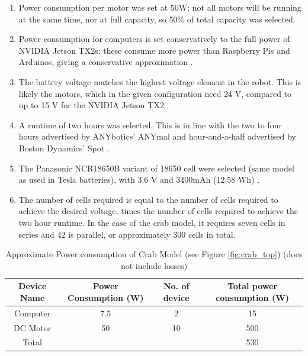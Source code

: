 \begin{enumerate}
    \item Power consumption per motor was set at 50W; not all motors will be running at the same time, nor at full capacity, so 50\% of total capacity was selected.
    \item Power consumption for computers is set conservatively to the full power of NVIDIA Jetson TX2s; these consume more power than Raspberry Pis and Arduinos, giving a conservative approximation \cite{gadget_makers_blog_arduino_2013} \cite{raspi.tv_how_2019} \cite{nvidia_jetson_2018}.
    \item The battery voltage matches the highest voltage element in the robot. This is likely the motors, which in the given configuration need 24 V, compared to up to 15 V for the NVIDIA Jetson TX2 \cite{nvidia_jetson_2018} \cite{maxon_motor_ec60_nodate}.
    \item A runtime of two hours was selected. This is in line with the two to four hours advertised by ANYbotics' ANYmal and hour-and-a-half advertised by Boston Dynamics' Spot \cite{anybotics_anymal_nodate} \cite{boston_dynamics_spot_2019}.
    \item The  Panasonic NCR18650B variant of 18650 cell were selected (same model as used in Tesla batteries), with 3.6 V and 3400mAh (12.58 Wh) \cite{18650_battery_store_18650_nodate} \cite{lambert_tear_2016}.
    \item The number of cells required is equal to the number of cells required to achieve the desired voltage, times the number of cells required to achieve the two hour runtime. In the case of the crab model, it requires seven cells in series and 42 is parallel, or approximately 300 cells in total.
\end{enumerate}

\begin{center}
    \begin{longtable}{ c c c c }
        \caption{Approximate Power consumption of Crab Model (see Figure \ref{fig:crab_top}) (does not include losses)}
        \label{table:power_consumption}
         \\ \hline
          Device Name & Power Consumption (W) & No. of device & Total power consumption (W)
         \\ \hline
         Computer & 7.5 & 2 & 15
         \\
         DC Motor & 50 & 10 & 500
         \\ \hline
         Total & & & 530
         \\ \hline
    \end{longtable}
\end{center}

